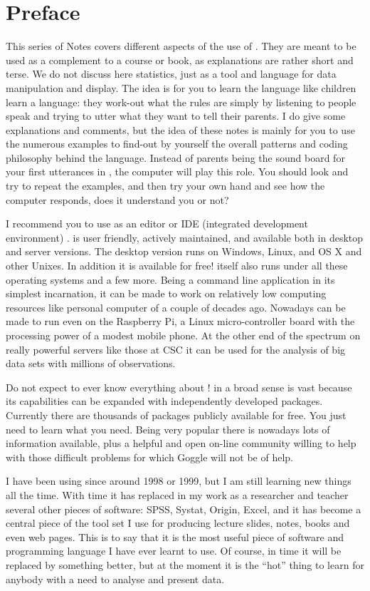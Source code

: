 \documentclass[paper=a4,10pt,div=17,headsepline,BCOR=12mm,twoside,open=right]{scrbook}\usepackage{knitr}
\begin{document}
\chapter*{Preface}

This series of Notes covers different aspects of the use of \R. They are meant to be used as a complement to a course or book, as explanations
are rather short and terse. We do not discuss here statistics, just \R as a tool and language for data manipulation and display. The idea is for you to learn the \R language like children learn a language: they work-out what the rules are simply by listening to people speak and trying to utter what they want to tell their parents. I do give some explanations and comments, but the idea of these notes is mainly for you to use the numerous examples to find-out by yourself the overall patterns and coding philosophy behind the \R language. Instead of parents being the sound board for your first utterances in \R, the computer will play this role. You should look and try to repeat the examples, and then try your own hand and see how the computer responds, does it understand you or not?

I recommend you to use as an editor or IDE (integrated development environment) \RStudio. \RStudio is user friendly, actively maintained, and available both in desktop and server versions. The desktop version runs on Windows, Linux, and OS X and other Unixes. In addition it is available for free! \R itself also runs under all these operating systems and a few more. Being \R a command line application in its simplest incarnation, it can be made to work on relatively low computing resources like personal computer of a couple of decades ago. Nowadays \R can be made to run even on the Raspberry Pi, a Linux micro-controller board with the processing power of a modest mobile phone. At the other end of the spectrum on really powerful servers like those at \textsf{CSC} it can be used for the analysis of big data sets with millions of observations.

Do not expect to ever know everything about \R! \R in a broad sense is vast because its capabilities can be expanded with independently developed packages. Currently there are thousands of packages publicly available for free. You just need to learn what you need. Being very popular there is nowadays lots of information available, plus a helpful and open on-line community willing to help with those difficult problems for which Goggle will not be of help.

I have been using \R since around 1998 or 1999, but I am still learning new things all the time. With time it has replaced in my work as a researcher and teacher several other pieces of software: \textsf{SPSS}, \textsf{Systat}, \textsf{Origin}, \textsf{Excel}, and it has become a central piece of the tool set I use for producing lecture slides, notes, books and even web pages. This is to say that it is the most useful piece of software and programming language I have ever learnt to use. Of course, in time it will be replaced by something better, but at the moment it is the ``hot'' thing to learn for anybody with a need to analyse and present data.
\end{document}
